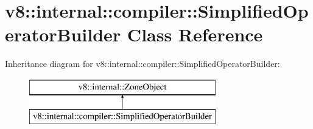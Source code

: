 \hypertarget{classv8_1_1internal_1_1compiler_1_1_simplified_operator_builder}{}\section{v8\+:\+:internal\+:\+:compiler\+:\+:Simplified\+Operator\+Builder Class Reference}
\label{classv8_1_1internal_1_1compiler_1_1_simplified_operator_builder}
Inheritance diagram for v8\+:\+:internal\+:\+:compiler\+:\+:Simplified\+Operator\+Builder\+:\begin{figure}[H]
\begin{center}
\leavevmode
\includegraphics[height=2.000000cm]{classv8_1_1internal_1_1compiler_1_1_simplified_operator_builder}
\end{center}
\end{figure}
